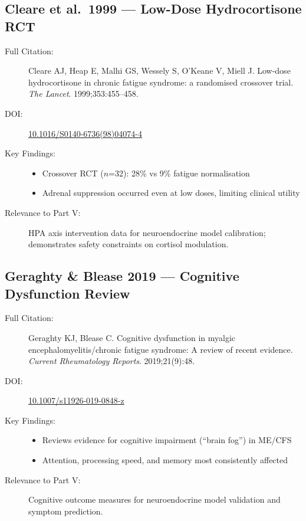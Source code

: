 \subsection{Cleare et al.\ 1999 --- Low-Dose Hydrocortisone RCT}

\begin{description}
    \item[Full Citation:] Cleare AJ, Heap E, Malhi GS, Wessely S, O'Keane V, Miell J. Low-dose hydrocortisone in chronic fatigue syndrome: a randomised crossover trial. \textit{The Lancet}. 1999;353:455--458. \cite{Cleare1999}
    \item[DOI:] \href{https://doi.org/10.1016/S0140-6736(98)04074-4}{10.1016/S0140-6736(98)04074-4}
    \item[Key Findings:]
    \begin{itemize}
        \item Crossover RCT ($n$=32): 28\% vs 9\% fatigue normalisation
        \item Adrenal suppression occurred even at low doses, limiting clinical utility
    \end{itemize}
    \item[Relevance to Part V:] HPA axis intervention data for neuroendocrine model calibration; demonstrates safety constraints on cortisol modulation.
\end{description}

\subsection{Geraghty \& Blease 2019 --- Cognitive Dysfunction Review}

\begin{description}
    \item[Full Citation:] Geraghty KJ, Blease C. Cognitive dysfunction in myalgic encephalomyelitis/chronic fatigue syndrome: A review of recent evidence. \textit{Current Rheumatology Reports}. 2019;21(9):48. \cite{geraghty2019cognitive}
    \item[DOI:] \href{https://doi.org/10.1007/s11926-019-0848-z}{10.1007/s11926-019-0848-z}
    \item[Key Findings:]
    \begin{itemize}
        \item Reviews evidence for cognitive impairment (``brain fog'') in ME/CFS
        \item Attention, processing speed, and memory most consistently affected
    \end{itemize}
    \item[Relevance to Part V:] Cognitive outcome measures for neuroendocrine model validation and symptom prediction.
\end{description}

